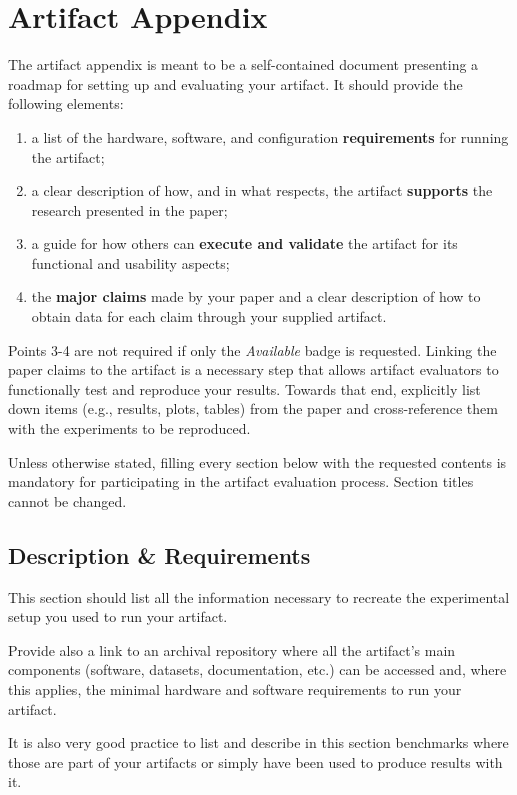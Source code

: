 \documentclass[conference]{IEEEtran}
\begin{document}

\appendices
\section{Artifact Appendix}

The artifact appendix is meant to be a self-contained document presenting a roadmap for setting up and evaluating your artifact. It should provide the following elements:
\begin{enumerate}
\item a list of the hardware, software, and configuration \textbf{requirements} for running the artifact;
\item a clear description of how, and in what respects, the artifact \textbf{supports} the research presented in the paper;
\item a guide for how others can \textbf{execute and validate} the artifact for its functional and usability aspects;
\item the \textbf{major claims} made by your paper and a clear description of how to obtain data for each claim through your supplied artifact.
\end{enumerate}

Points 3-4 are not required if only the \textit{Available} badge is requested. Linking the paper claims to the artifact is a necessary step that allows artifact evaluators to functionally test and reproduce your results. Towards that end, explicitly list down items (e.g., results, plots, tables) from the paper and cross-reference them with the experiments to be reproduced.
 
Unless otherwise stated, filling every section below with the requested contents is mandatory for participating in the artifact evaluation process. Section titles cannot be changed.

\subsection{Description \& Requirements}

This section should list all the information necessary to recreate the experimental setup you used to run your artifact.

Provide also a link to an archival repository where all the artifact's main components (software, datasets, documentation, etc.) can be accessed and, where this applies, the minimal hardware and software requirements to run your artifact.

It is also very good practice to list and describe in this section benchmarks where those are part of your artifacts or simply have been used to produce results with it.
\end{document}

